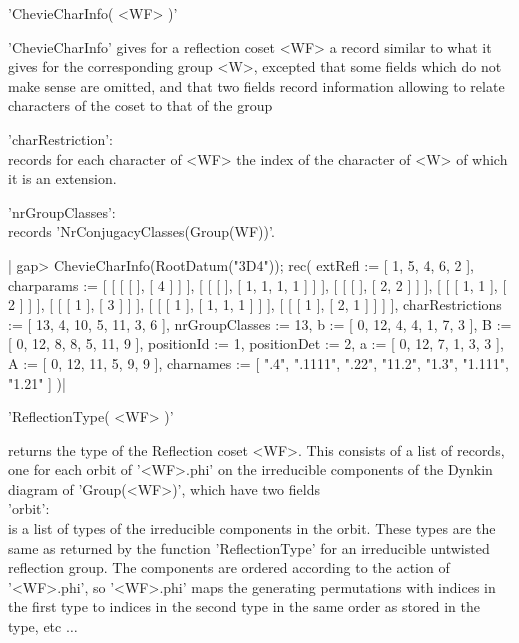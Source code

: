 
'ChevieCharInfo( <WF> )'

'ChevieCharInfo' gives for a reflection coset <WF> a record similar to what
it  gives for the corresponding group  <W>, excepted that some fields which
do  not  make  sense  are  omitted,  and that two fields record information
allowing to relate characters of the coset to that of the group\:

'charRestriction':\\ records for each character of <WF> the index of the
   character of <W> of which it is an extension.

'nrGroupClasses':\\ records 'NrConjugacyClasses(Group(WF))'.

|    gap> ChevieCharInfo(RootDatum("3D4"));
    rec(
      extRefl := [ 1, 5, 4, 6, 2 ],
      charparams := [ [ [ [  ], [ 4 ] ] ], [ [ [  ], [ 1, 1, 1, 1 ] ] ],
          [ [ [  ], [ 2, 2 ] ] ], [ [ [ 1, 1 ], [ 2 ] ] ],
          [ [ [ 1 ], [ 3 ] ] ], [ [ [ 1 ], [ 1, 1, 1 ] ] ],
          [ [ [ 1 ], [ 2, 1 ] ] ] ],
      charRestrictions := [ 13, 4, 10, 5, 11, 3, 6 ],
      nrGroupClasses := 13,
      b := [ 0, 12, 4, 4, 1, 7, 3 ],
      B := [ 0, 12, 8, 8, 5, 11, 9 ],
      positionId := 1,
      positionDet := 2,
      a := [ 0, 12, 7, 1, 3, 3 ],
      A := [ 0, 12, 11, 5, 9, 9 ],
      charnames := [ ".4", ".1111", ".22", "11.2", "1.3", "1.111", "1.21"
         ] )|


'ReflectionType( <WF> )'

returns  the type of the Reflection coset  <WF>. This consists of a list of
records,  one for each orbit of '<WF>.phi' on the irreducible components of
the Dynkin diagram of 'Group(<WF>)', which have two fields\:\\

'orbit':\\ is a list of types of the irreducible components in the orbit.
   These  types are the  same as returned  by the function 'ReflectionType'
   for  an  irreducible  untwisted  reflection  group.  The  components are
   ordered  according to the  action of '<WF>.phi',  so '<WF>.phi' maps the
   generating permutations with indices in the first type to indices in the
   second type in the same order as stored in the type, etc $\ldots$\\

